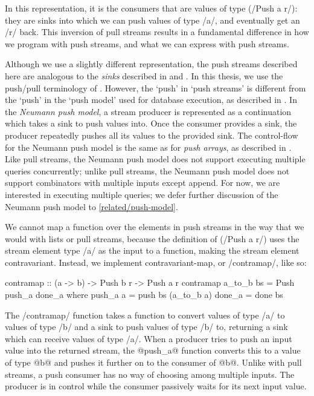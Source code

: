 In this representation, it is the consumers that are values of type (\Hs/Push a r/): they are sinks into which we can push values of type \Hs/a/, and eventually get an \Hs/r/ back.
This inversion of pull streams results in a fundamental difference in how we program with push streams, and what we can express with push streams.

Although we use a slightly different representation, the push streams described here are analogous to the \emph{sinks} described in \citet{bernardy2015duality} and \citet{lippmeier2016polarized}.
In this thesis, we use the push/pull terminology of \citet{kay2009you}.
However, the `push' in `push streams' is different from the `push' in the `push model' used for database execution, as described in \citet{neumann2011efficiently}.
In the \emph{Neumann push model}, a stream producer is represented as a continuation which takes a sink to push values into.
Once the consumer provides a sink, the producer repeatedly pushes all its values to the provided sink.
The control-flow for the Neumann push model is the same as for \emph{push arrays}, as described in \citet{claessen2012expressive}.
Like pull streams, the Neumann push model does not support executing multiple queries concurrently; unlike pull streams, the Neumann push model does not support combinators with multiple inputs except append.
For now, we are interested in executing multiple queries; we defer further discussion of the Neumann push model to \cref{related/push-model}.


We cannot map a function over the elements in push streams in the way that we would with lists or pull streams, because the definition of (\Hs/Push a r/) uses the stream element type \Hs/a/ as the input to a function, making the stream element contravariant.
Instead, we implement contravariant-map, or \Hs/contramap/, like so:

\begin{haskell}
contramap :: (a -> b) -> Push b r -> Push a r
contramap a_to_b bs = Push push_a done_a
 where
  push_a a = push bs (a_to_b a)
  done_a   = done bs
\end{haskell}

The \Hs/contramap/ function takes a function to convert values of type \Hs/a/ to values of type \Hs/b/ and a sink to push values of type \Hs/b/ to, returning a sink which can receive values of type \Hs/a/.
When a producer tries to push an input value into the returned stream, the @push_a@ function converts this to a value of type @b@ and pushes it further on to the consumer of @b@.
Unlike with pull streams, a push consumer has no way of choosing among multiple inputs.
The producer is in control while the consumer passively waits for its next input value.

